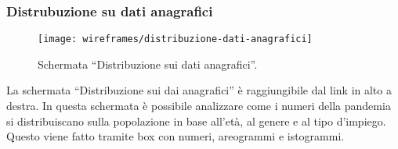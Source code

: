 \subsubsection{Distrubuzione su dati anagrafici}\label{ss:distribuzione-su-dati-anagrafici}
\begin{figure}[H]
    \centering
    \texttt{[image: wireframes/distribuzione-dati-anagrafici]}
    \caption{Schermata ``Distribuzione sui dati anagrafici''.}\label{fig:distribuzione-dati-anagrafici}
\end{figure}
La schermata ``Distribuzione sui dai anagrafici'' è raggiungibile dal link in alto a destra. In questa schermata è possibile analizzare come i numeri della pandemia si distribuiscano sulla popolazione in base all'età, al genere e al tipo d'impiego. Questo viene fatto tramite box con numeri, areogrammi e istogrammi.

